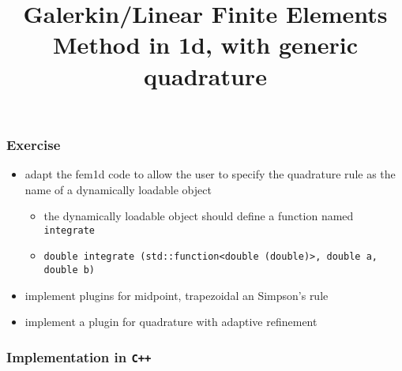 \documentclass[smaller,a4paper]{beamer}
\newcommand{\cpp}[1]{\lstinline!#1!}
\begin{document}
\title{Galerkin/Linear Finite Elements Method in 1d, with generic quadrature}
\frame{\titlepage}


\begin{frame}\frametitle{Exercise}
\begin{itemize}
\item adapt the fem1d code to allow the user to specify the quadrature rule as the name of a dynamically loadable object
\begin{itemize}
\item the dynamically loadable object should define a function named \cpp{integrate}
\item \cpp{double integrate (std::function<double (double)>, double a, double b)}
\end{itemize}
\item implement plugins for midpoint, trapezoidal an Simpson's rule
\item implement a plugin for quadrature with adaptive refinement
\end{itemize}
\end{frame}



\begin{frame}[fragile]
\frametitle{Implementation in {\tt C++} }
\tiny
{}
\end{frame}
\end{document}
